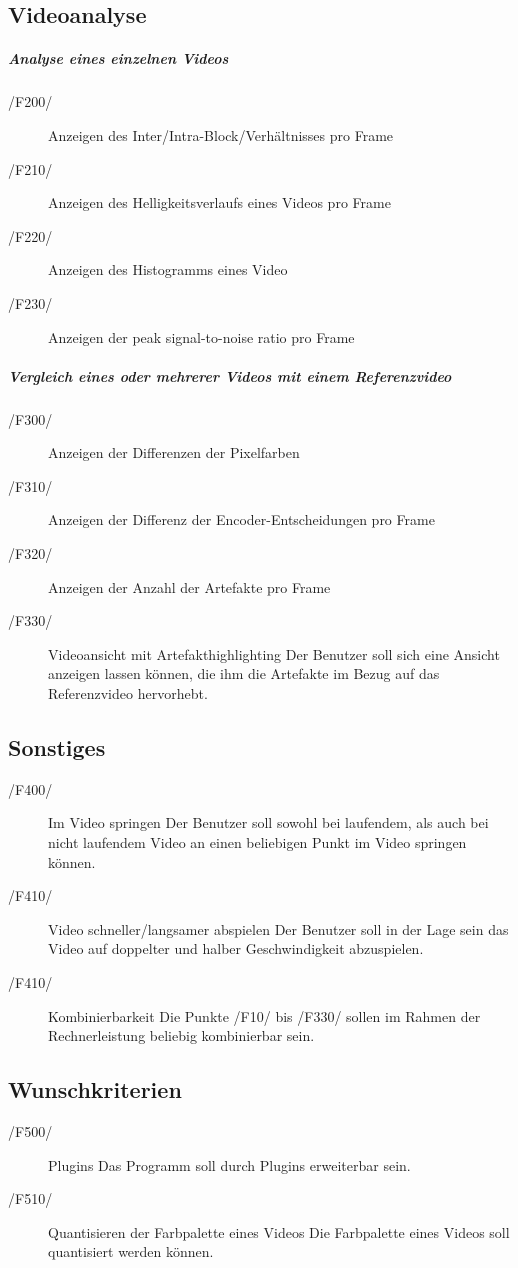 \subsection{Videoanalyse}
\subparagraph{Analyse eines einzelnen Videos} 
	\begin{description}
	        \item[/F200/]Anzeigen des Inter/Intra-Block/Verhältnisses pro Frame
                \item[/F210/]Anzeigen des Helligkeitsverlaufs eines Videos pro Frame
                \item[/F220/]Anzeigen des Histogramms eines Video
                \item[/F230/]Anzeigen der peak signal-to-noise ratio pro Frame
        \end{description}
\subparagraph{Vergleich eines oder mehrerer Videos mit einem Referenzvideo}
        \begin{description}
   	        \item[/F300/]Anzeigen der Differenzen der Pixelfarben
                \item[/F310/]Anzeigen der Differenz der Encoder-Entscheidungen pro Frame
                \item[/F320/]Anzeigen der Anzahl der Artefakte pro Frame
                \item[/F330/]Videoansicht mit Artefakthighlighting \newline
			Der Benutzer soll sich eine Ansicht anzeigen lassen können, die ihm die Artefakte im Bezug auf das Referenzvideo hervorhebt.
        \end{description}  
\subsection{Sonstiges}
	\begin{description}
		\item[/F400/]Im Video springen \newline
			Der Benutzer soll sowohl bei laufendem, als auch bei nicht laufendem Video an einen beliebigen Punkt im Video springen können.
		\item[/F410/]Video schneller/langsamer abspielen \newline
			Der Benutzer soll in der Lage sein das Video auf doppelter und halber Geschwindigkeit abzuspielen.	
  		\item[/F410/]Kombinierbarkeit \newline
			Die Punkte /F10/ bis /F330/ sollen im Rahmen der Rechnerleistung beliebig kombinierbar sein.
        \end{description}

\subsection{Wunschkriterien}
	\begin{description}
		\item[/F500/]Plugins \newline
			Das Programm soll durch Plugins erweiterbar sein.
		\item[/F510/]Quantisieren der Farbpalette eines Videos \newline
			Die Farbpalette eines Videos soll quantisiert werden können.
	\end{description}

 

